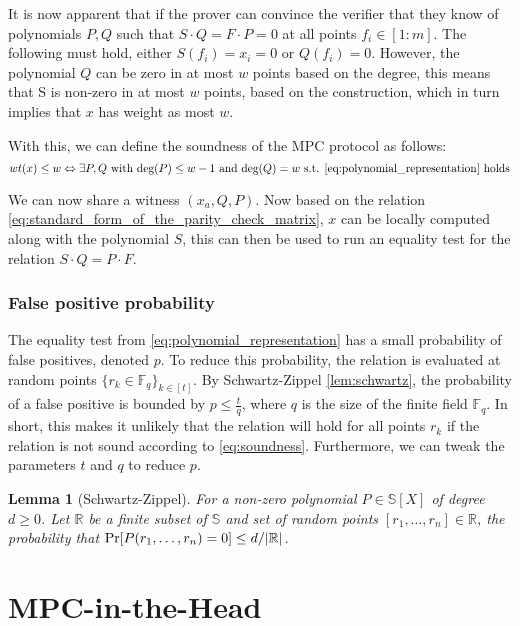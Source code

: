\documentclass[twoside,11pt]{report}
\theoremstyle{definition}
\theoremstyle{plain}
\newtheorem{lemma}{Lemma}[section]
\begin{document}
It is now apparent that if the prover can convince the verifier that they know of polynomials $P,Q$ such that $S\cdot Q = F \cdot P = 0$ at all points $f_i \in [1:m]$. The following must hold, either $S(f_i) = x_i = 0$ or $Q(f_i) = 0$. However, the polynomial $Q$ can be zero in at most $w$ points based on the degree, this means that S is non-zero in at most $w$ points, based on the construction, which in turn implies that $x$ has weight as most $w$.

With this, we can define the soundness of the MPC protocol as follows:
\begin{equation}
  wt(x) \leq w \Leftrightarrow \exists P,Q \text{  with  }\text{deg}(P)\leq w-1\text{  and  }\text{deg}(Q) = w\text{ s.t. \autoref{eq:polynomial_representation} holds}\label{eq:soundness}
\end{equation}

We can now share a witness $(x_a, Q, P)$. Now based on the relation \autoref{eq:standard_form_of_the_parity_check_matrix}, $x$ can be locally computed along with the polynomial $S$, this can then be used to run an equality test for the relation $S \cdot Q = P \cdot F$.

\subsubsection{False positive probability}\label{sub:equality_test}
The equality test from \autoref{eq:polynomial_representation} has a small probability of false positives, denoted $p$. To reduce this probability, the relation is evaluated at random points $\{r_k \in \mathbb{F}_q{\}}_{k\in[t]}$. By Schwartz-Zippel \autoref{lem:schwartz}, the probability of a false positive is bounded by $p \leq \frac{t}{q}$, where $q$ is the size of the finite field $\mathbb{F}_q$. In short, this makes it unlikely that the relation will hold for all points $r_k$ if the relation is not sound according to \autoref{eq:soundness}. Furthermore, we can tweak the parameters $t$ and $q$ to reduce $p$.

\begin{lemma}[Schwartz-Zippel]\label{lem:schwartz}
  For a non-zero polynomial $P \in \mathbb{S}[X]$ of degree $d \geq 0$. Let $\mathbb{R}$ be a finite subset of $\mathbb{S}$ and set of random points $[r_1, \dots, r_n] \in \mathbb{R}$, the probability that $\textnormal{Pr}[P(r_1, \dots, r_n) = 0] \leq d/|\mathbb{R}|$.
\end{lemma}

\section{MPC-in-the-Head}\label{sec:mpcinth}
\end{document}

